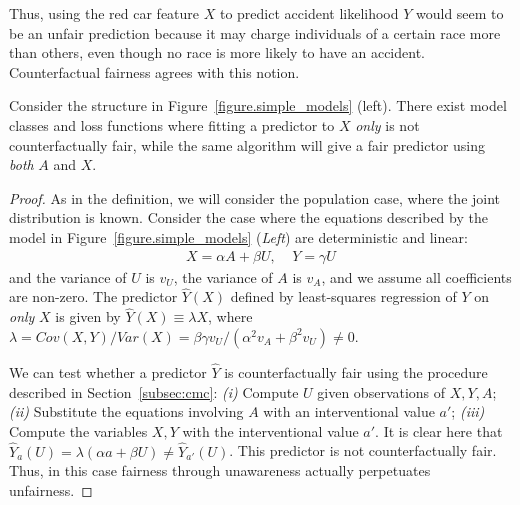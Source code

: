 Thus, using the red car feature $X$ to predict accident likelihood $Y$
would seem to be an unfair prediction because it may charge
individuals of a certain race more than others, even though no
  race is more likely to have an accident. Counterfactual fairness
agrees with this notion.
%
\begin{lem}
Consider the structure in Figure~\ref{figure.simple_models}
(left). There exist model classes and loss functions where fitting a
predictor to $X$ \emph{only} is not counterfactually fair, while the same
algorithm will give a fair predictor using \emph{both} $A$ and $X$.
\end{lem}
%
\begin{proof}
As in the definition, we will consider the population case, where the
joint distribution is known. Consider the case where the equations
described by the model in Figure~\ref{figure.simple_models}
(\emph{Left}) are deterministic and linear:
\begin{align}
X = \alpha A + \beta U, \;\;\;\; Y = \gamma U \nonumber
\end{align}
and the variance of $U$ is $v_U$, the variance of $A$ is $v_A$,
and we assume all coefficients are non-zero.
The predictor $\hat Y(X)$ defined by least-squares
regression of $Y$ on \emph{only} $X$ is given by $\hat Y(X) \equiv \lambda X$, where $\lambda =
Cov(X, Y) / Var(X) \!=\! \beta\gamma v_U / (\alpha^2 v_A + \beta^2 v_U) \neq 0$.

We can test whether a predictor $\hat{Y}$ is counterfactually fair
using the procedure described in Section~\ref{subsec:cmc}:
{\em (i)} Compute $U$ given observations of $X,Y,A$; %
{\em (ii)} Substitute the equations involving $A$ with an interventional value $a'$; 
{\em (iii)} Compute the variables $X,Y$ with the interventional value $a'$. It is clear here that $\hat Y_a(U) \!=\! \lambda(\alpha a + \beta U) \neq
\hat Y_{a'}(U)$. This predictor is not counterfactually fair. Thus, in this case fairness through unawareness actually perpetuates unfairness.


\end{proof}
